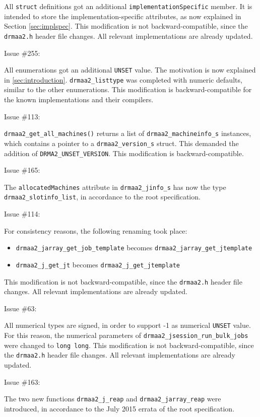 \documentclass{article}
\newcommand{\h}[1]{\texttt{#1}}
\begin{document}
All \h{struct} definitions got an additional \h{implementationSpecific} member. It is intended to store the implementation-specific attributes, as now explained in Section \ref{sec:implspec}. This modification is not backward-compatible, since the \h{drmaa2.h} header file changes. All relevant implementations are already updated.

Issue \#255:

All enumerations got an additional \h{UNSET} value. The motivation is now explained in \ref{sec:introduction}. \h{drmaa2\_listtype} was completed with numeric defaults, similar to the other enumerations. This modification is backward-compatible for the known implementations and their compilers.

Issue \#113:

\h{drmaa2\_get\_all\_machines()} returns a list of \h{drmaa2\_machineinfo\_s} instances, which contains a pointer to a \h{drmaa2\_version\_s} struct. This demanded the addition of \h{DRMA2\_UNSET\_VERSION}. This modification is backward-compatible.

Issue \#165:

The \h{allocatedMachines} attribute in \h{drmaa2\_jinfo\_s} has now the type \h{drmaa2\_slotinfo\_list}, in accordance to the root specification.

Issue \#114:

For consistency reasons, the following renaming took place:

\begin{itemize}
	\item \h{drmaa2\_jarray\_get\_job\_template} becomes \h{drmaa2\_jarray\_get\_jtemplate}
	\item \h{drmaa2\_j\_get\_jt} becomes \h{drmaa2\_j\_get\_jtemplate}
\end{itemize}

This modification is not backward-compatible, since the \h{drmaa2.h} header file changes. All relevant implementations are already updated.

Issue \#63:

All numerical types are signed, in order to support -1 as numerical \h{UNSET} value. For this reason, the numerical parameters of \h{drmaa2\_jsession\_run\_bulk\_jobs} were changed to \h{long long}. This modification is not backward-compatible, since the \h{drmaa2.h} header file changes. All relevant implementations are already updated.

Issue \#163:

The two new functions \h{drmaa2\_j\_reap} and \h{drmaa2\_jarray\_reap} were introduced, in accordance to the July 2015 errata of the root specification.
\end{document}

